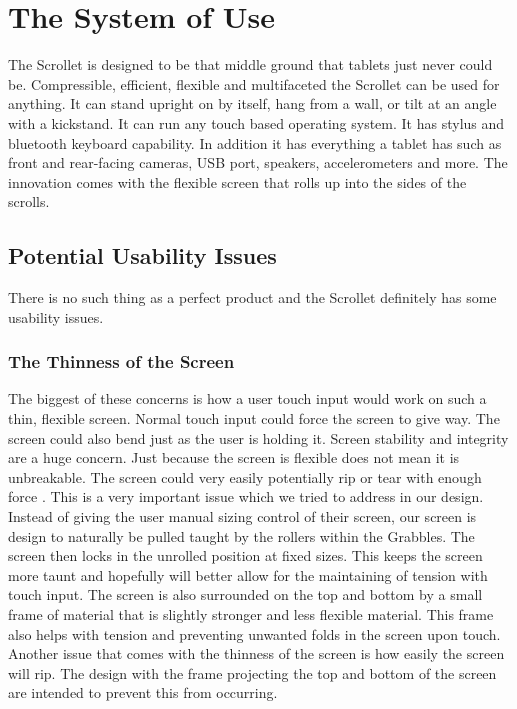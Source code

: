 \documentclass[a4paper]{article}
\begin{document}
\section{The System of Use}
The Scrollet is designed to be that middle ground that tablets just never could be. Compressible, efficient, flexible and multifaceted the Scrollet can be used for anything. It can stand upright on by itself, hang from a wall, or tilt at an angle with a kickstand. It can run any touch based operating system. It has stylus and bluetooth keyboard capability. In addition it has everything a tablet has such as front and rear-facing cameras, USB port, speakers, accelerometers and more. The innovation comes with the flexible screen that rolls up into the sides of the scrolls.

\subsection{Potential Usability Issues}
There is no such thing as a perfect product and the Scrollet definitely has some usability issues.
\subsubsection{The Thinness of the Screen}
The biggest of these concerns is how a user touch input would work on such a thin, flexible screen. Normal touch input could force the screen to give way. \cite{Dijkstra} The screen could also bend just as the user is holding it. Screen stability and integrity are a huge concern. Just because the screen is flexible does not mean it is unbreakable. The screen could very easily potentially rip or tear with enough force \cite{Dijkstra}. This is a very important issue which we tried to address in our design. Instead of giving the user manual sizing control of their screen, our screen is design to naturally be pulled taught by the rollers within the Grabbles. The screen then locks in the unrolled position at fixed sizes. This keeps the screen more taunt and hopefully will better allow for the maintaining of tension with touch input. The screen is also surrounded on the top and bottom by a small frame of material that is slightly stronger and less flexible material. This frame also helps with tension and preventing unwanted folds in the screen upon touch. Another issue that comes with the thinness of the screen is how easily the screen will rip. The design with the frame projecting the top and bottom of the screen are intended to prevent this from occurring. 
\end{document}
